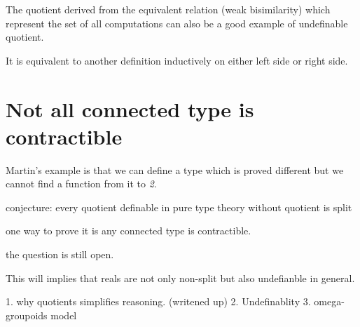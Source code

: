 The quotient derived from the equivalent relation (weak bisimilarity) which represent
the set of all computations can also be a good
example of undefinable quotient.

It is equivalent to another definition inductively on either left side
or right side.


\section{Not all connected type is contractible}

Martin's example is that we can define a type which is proved
different but we cannot find a function from it to \emph{2}.


conjecture: every quotient definable in pure type theory without
quotient is split

one way to prove it is any connected type is contractible.

the question is still open.


This will implies that reals are not only non-split but also
undefianble in general.


1. why quotients simplifies reasoning. (writened up)
2. Undefinablity
3. omega-groupoids model
